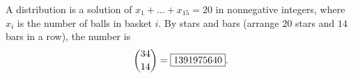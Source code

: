 A distribution is a solution of $x_1+\dots+x_{15}=20$ in nonnegative integers, where $x_i$ is the number of balls in basket $i$. By stars and bars (arrange $20$ stars and $14$ bars in a row), the number is
\[
\dbinom{34}{14}=\boxed{1391975640}.
\]
